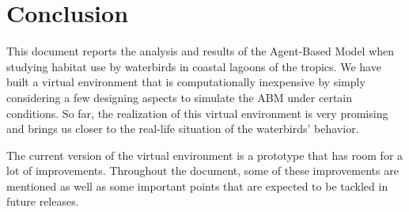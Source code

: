 \section{Conclusion}
This document reports the analysis and results of the Agent-Based Model when studying habitat use by waterbirds in coastal lagoons of the tropics. We have built a virtual environment that is computationally inexpensive by simply considering a few designing aspects to simulate the ABM under certain conditions. So far, the realization of this virtual environment is very promising and brings us closer to the real-life situation of the waterbirds' behavior.

The current version of the virtual environment is a prototype that has room for a lot of improvements. Throughout the document, some of these improvements are mentioned as well as some important points that are expected to be tackled in future releases.

